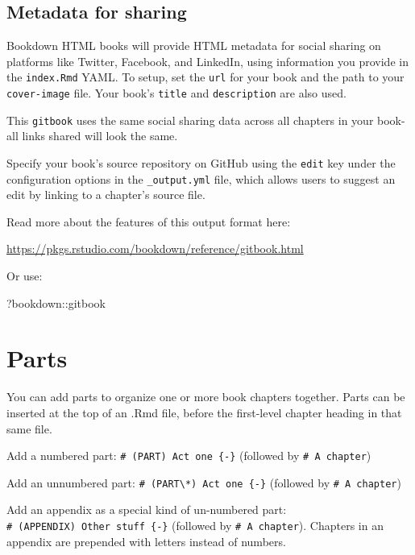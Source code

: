 \documentclass[
]{book}
\newenvironment{Shaded}{\begin{snugshade}}{\end{snugshade}}
\newcommand{\NormalTok}[1]{#1}
\newcommand{\SpecialCharTok}[1]{\textcolor[rgb]{0.00,0.00,0.00}{#1}}
\theoremstyle{definition}
\theoremstyle{definition}
\theoremstyle{definition}
\theoremstyle{definition}
\theoremstyle{remark}
\begin{document}
\hypertarget{metadata-for-sharing}{%
\section{Metadata for sharing}\label{metadata-for-sharing}}

Bookdown HTML books will provide HTML metadata for social sharing on platforms like Twitter, Facebook, and LinkedIn, using information you provide in the \texttt{index.Rmd} YAML. To setup, set the \texttt{url} for your book and the path to your \texttt{cover-image} file. Your book's \texttt{title} and \texttt{description} are also used.

This \texttt{gitbook} uses the same social sharing data across all chapters in your book- all links shared will look the same.

Specify your book's source repository on GitHub using the \texttt{edit} key under the configuration options in the \texttt{\_output.yml} file, which allows users to suggest an edit by linking to a chapter's source file.

Read more about the features of this output format here:

\url{https://pkgs.rstudio.com/bookdown/reference/gitbook.html}

Or use:

\begin{Shaded}
\begin{Highlighting}[]
\NormalTok{?bookdown}\SpecialCharTok{::}\NormalTok{gitbook}
\end{Highlighting}
\end{Shaded}

\hypertarget{parts}{%
\chapter{Parts}\label{parts}}

You can add parts to organize one or more book chapters together. Parts can be inserted at the top of an .Rmd file, before the first-level chapter heading in that same file.

Add a numbered part: \texttt{\#\ (PART)\ Act\ one\ \{-\}} (followed by \texttt{\#\ A\ chapter})

Add an unnumbered part: \texttt{\#\ (PART\textbackslash{}*)\ Act\ one\ \{-\}} (followed by \texttt{\#\ A\ chapter})

Add an appendix as a special kind of un-numbered part: \texttt{\#\ (APPENDIX)\ Other\ stuff\ \{-\}} (followed by \texttt{\#\ A\ chapter}). Chapters in an appendix are prepended with letters instead of numbers.

  
\end{document}
